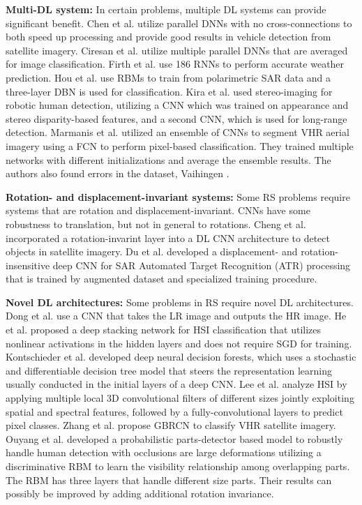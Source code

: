 \documentclass[12pt]{spieman}
\begin{document}
\begin{spacing}{1}
\textbf{Multi-DL system:} In certain problems, multiple DL systems can provide significant benefit. Chen et al. \cite{chen2014vehicle} utilize parallel DNNs with no cross-connections to both speed up processing and provide good results in vehicle detection from satellite imagery. Ciresan et al. \cite{Ciresan2012} utilize multiple parallel DNNs that are averaged for image classification. Firth et al. \cite{firth2016novel} use 186 RNNs to perform accurate weather prediction. Hou et al. \cite{Hou2015Polarimetric} use RBMs to train from polarimetric SAR data and a three-layer DBN is used for classification. Kira et al. \cite{Kira2012} used stereo-imaging for robotic human detection, utilizing a CNN which was trained on appearance and stereo disparity-based features, and a second CNN, which is used for long-range detection. Marmanis et al. \cite{Marmanis2016Semantic} utilized an ensemble of CNNs to segment VHR aerial imagery using a FCN to perform pixel-based classification. They trained multiple networks with different initializations and average the ensemble results. The authors also found errors in the dataset, Vaihingen \cite{rottensteiner2012isprs} .


\textbf{Rotation- and displacement-invariant systems:} Some RS problems require systems that are rotation and displacement-invariant. CNNs have some robustness to translation, but not in general to rotations. Cheng et al. \cite{Cheng2016Learning} incorporated a rotation-invarint layer into a DL CNN architecture to detect objects in satellite imagery. Du et al. \cite{du2016sar} developed a displacement- and rotation-insensitive deep CNN for SAR Automated Target Recognition (ATR) processing that is trained by augmented dataset and specialized training procedure.


\textbf{Novel DL architectures:} Some problems in RS require novel DL architectures. Dong et al. \cite{dong2016image} use a CNN that takes the LR image and outputs the HR image. He et al. \cite{He2016Hyperspectral} proposed a deep stacking network for HSI classification that utilizes nonlinear activations in the hidden layers and does not require SGD for training. Kontschieder et al. \cite{kontschieder2015deep} developed deep neural decision forests, which uses a stochastic and differentiable decision tree model that steers the representation learning usually conducted in the initial layers of a deep CNN. Lee et al. \cite{Lee2016Contextual} analyze HSI by applying multiple local 3D convolutional filters of different sizes jointly exploiting spatial and spectral features, followed by a fully-convolutional layers to predict pixel classes. Zhang et al. \cite{zhang2016scene} propose GBRCN to classify VHR satellite imagery. Ouyang et al. \cite{ouyang2012discriminative} developed a probabilistic parts-detector based model to robustly handle human detection with occlusions are large deformations utilizing a discriminative RBM to learn the visibility relationship among overlapping parts. The RBM has three layers that handle different size parts. Their results can possibly be improved by adding additional rotation invariance.



\end{spacing}
\end{document}
